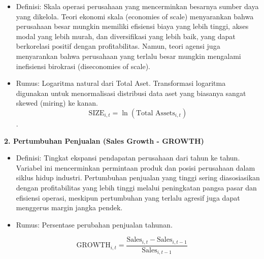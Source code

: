 \documentclass[12pt,a4paper]{report}
\providecommand{\tightlist}{%
  \setlength{\itemsep}{0pt}\setlength{\parskip}{0pt}%
}
\begin{document}
\begin{itemize}
\tightlist
\item
  Definisi: Skala operasi perusahaan yang mencerminkan besarnya sumber
  daya yang dikelola. Teori ekonomi skala (economies of scale)
  menyarankan bahwa perusahaan besar mungkin memiliki efisiensi biaya
  yang lebih tinggi, akses modal yang lebih murah, dan diversifikasi
  yang lebih baik, yang dapat berkorelasi positif dengan profitabilitas.
  Namun, teori agensi juga menyarankan bahwa perusahaan yang terlalu
  besar mungkin mengalami inefisiensi birokrasi (diseconomies of scale).
\item
  Rumus: Logaritma natural dari Total Aset. Transformasi logaritma
  digunakan untuk menormalisasi distribusi data aset yang biasanya
  sangat skewed (miring) ke kanan. \[
  \mathrm{SIZE}_{i,t} = \ln(\text{Total Assets}_{i,t})
  \] .
\end{itemize}

\textbf{2. Pertumbuhan Penjualan (Sales Growth - GROWTH)}

\begin{itemize}
\tightlist
\item
  Definisi: Tingkat ekspansi pendapatan perusahaan dari tahun ke tahun.
  Variabel ini mencerminkan permintaan produk dan posisi perusahaan
  dalam siklus hidup industri. Pertumbuhan penjualan yang tinggi sering
  diasosiasikan dengan profitabilitas yang lebih tinggi melalui
  peningkatan pangsa pasar dan efisiensi operasi, meskipun pertumbuhan
  yang terlalu agresif juga dapat menggerus margin jangka pendek.
\item
  Rumus: Persentase perubahan penjualan tahunan.
\end{itemize}

\[
\mathrm{GROWTH}_{i,t} = \frac{\text{Sales}_{i,t} - \text{Sales}_{i,t-1}}{\text{Sales}_{i,t-1}}
\]
\end{document}
